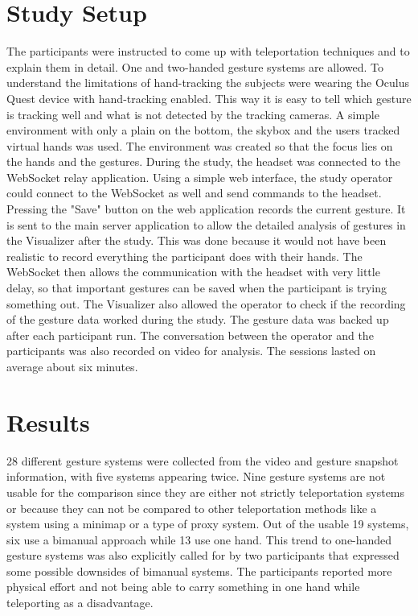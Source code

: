 \section{Study Setup}
The participants were instructed to come up with teleportation techniques and to explain them in detail. One and two-handed gesture systems are allowed. To understand the limitations of hand-tracking the subjects were wearing the Oculus Quest device with hand-tracking enabled. This way it is easy to tell which gesture is tracking well and what is not detected by the tracking cameras. A simple environment with only a plain on the bottom, the skybox and the users tracked virtual hands was used. The environment was created so that the focus lies on the hands and the gestures. During the study, the headset was connected to the WebSocket relay application. Using a simple web interface, the study operator could connect to the WebSocket as well and send commands to the headset. Pressing the "Save" button on the web application records the current gesture. It is sent to the main server application to allow the detailed analysis of gestures in the Visualizer after the study. This was done because it would not have been realistic to record everything the participant does with their hands. The WebSocket then allows the communication with the headset with very little delay, so that important gestures can be saved when the participant is trying something out. The Visualizer also allowed the operator to check if the recording of the gesture data worked during the study. The gesture data was backed up after each participant run. The conversation between the operator and the participants was also recorded on video for analysis. The sessions lasted on average about six minutes.


\section{Results}
28 different gesture systems were collected from the video and gesture snapshot information, with five systems appearing twice. Nine gesture systems are not usable for the comparison since they are either not strictly teleportation systems or because they can not be compared to other teleportation methods like a system using a minimap or a type of proxy system. Out of the usable 19 systems, six use a bimanual approach while 13 use one hand. This trend to one-handed gesture systems was also explicitly called for by two participants that expressed some possible downsides of bimanual systems. The participants reported more physical effort and not being able to carry something in one hand while teleporting as a disadvantage.


